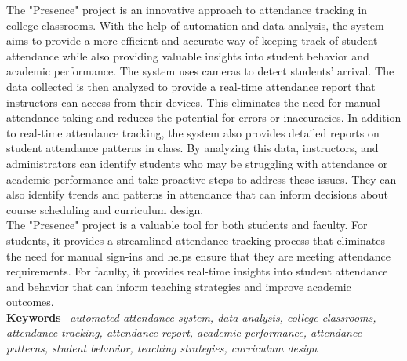 The "Presence" project is an innovative approach to attendance tracking in college classrooms. With the help of automation and data analysis, the system aims to provide a more efficient and accurate way of keeping track of student attendance while also providing valuable insights into student behavior and academic performance. The system uses cameras to detect students' arrival. The data collected is then analyzed to provide a real-time attendance report that instructors can access from their devices. This eliminates the need for manual attendance-taking and reduces the potential for errors or inaccuracies. In addition to real-time attendance tracking, the system also provides detailed reports on student attendance patterns in class. By analyzing this data, instructors, and administrators can identify students who may be struggling with attendance or academic performance and take proactive steps to address these issues. They can also identify trends and patterns in attendance that can inform decisions about course scheduling and curriculum design.\\

The "Presence" project is a valuable tool for both students and faculty. For students, it provides a streamlined attendance tracking process that eliminates the need for manual sign-ins and helps ensure that they are meeting attendance requirements. For faculty, it provides real-time insights into student attendance and behavior that can inform teaching strategies and improve academic outcomes.\\ 

\textbf{Keywords}--
\textit{ automated attendance system, data analysis, college classrooms, attendance tracking, attendance report, academic performance, attendance patterns, student behavior, teaching strategies, curriculum design }
